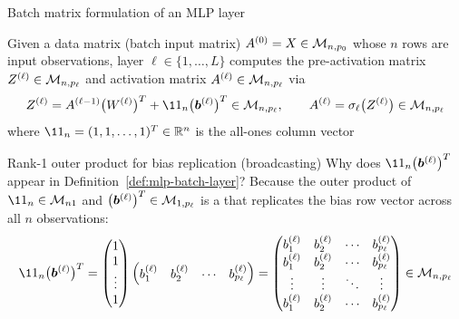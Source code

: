 \documentclass[aspectratio=169]{beamer}\usepackage[]{graphicx}\usepackage[]{xcolor}
\begin{document}
\begin{frame}{Batch matrix formulation of an MLP layer}
\begin{importantdefinition}
\label{def:mlp-batch-layer}
Given a data matrix (batch input matrix) $A^{(0)} = X \in \mathcal{M}_{n, p_0}$ whose $n$ rows are input observations, layer $\ell \in \{1, \ldots, L\}$ computes the pre-activation matrix $Z^{(\ell)} \in \mathcal{M}_{n, p_\ell}$ and activation matrix $A^{(\ell)} \in \mathcal{M}_{n, p_\ell}$ via
\[
Z^{(\ell)} = A^{(\ell-1)} \big(W^{(\ell)}\big)^T + \11_n \big(\bb^{(\ell)}\big)^T \in \M_{n, p_\ell}, \qquad
A^{(\ell)} = \sigma_\ell\big(Z^{(\ell)}\big) \in \M_{n, p_\ell}
\]
where $\11_n = (1, 1, \ldots, 1)^T \in \IR^n$ is the all-ones column vector
\end{importantdefinition}
\end{frame}


\begin{frame}{Rank-1 outer product for bias replication (broadcasting)}
Why does $\11_n \big(\bb^{(\ell)}\big)^T$ appear in Definition~\ref{def:mlp-batch-layer}?
\vfill
Because the outer product of $\11_n \in \M_{n1}$ and $\big(\bm{b}^{(\ell)}\big)^T \in \mathcal{M}_{1, p_\ell}$ is a  that replicates the bias row vector across all $n$ observations:
\[
\11_n \big(\bb^{(\ell)}\big)^T =
\begin{pmatrix} 1 \\ 1 \\ \vdots \\ 1 \end{pmatrix}
\begin{pmatrix} b_1^{(\ell)} & b_2^{(\ell)} & \cdots & b_{p_\ell}^{(\ell)} \end{pmatrix}
=
\begin{pmatrix}
b_1^{(\ell)} & b_2^{(\ell)} & \cdots & b_{p_\ell}^{(\ell)} \\
b_1^{(\ell)} & b_2^{(\ell)} & \cdots & b_{p_\ell}^{(\ell)} \\
\vdots & \vdots & \ddots & \vdots \\
b_1^{(\ell)} & b_2^{(\ell)} & \cdots & b_{p_\ell}^{(\ell)}
\end{pmatrix} \in \M_{n, p_\ell}
\]
\end{frame}
\end{document}
